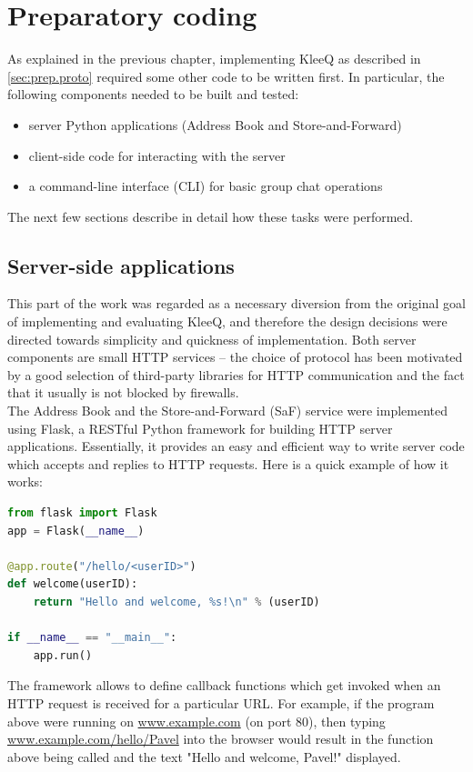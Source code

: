\documentclass[a4paper, 12pt]{report}
\begin{document}
\section{Preparatory coding}
\label{sec:impl.prep}
As explained in the previous chapter, implementing KleeQ as described in \cref{sec:prep.proto} required some other code to be written first. In particular, the following components needed to be built and tested:
\begin{itemize}
    \item server Python applications (Address Book and Store-and-Forward)
    \item client-side code for interacting with the server
    \item a command-line interface (CLI) for basic group chat operations
\end{itemize}
The next few sections describe in detail how these tasks were performed.

\subsection{Server-side applications}
\label{subsec:impl.prep.server}
This part of the work was regarded as a necessary diversion from the original goal of implementing and evaluating KleeQ, and therefore the design decisions were directed towards simplicity and quickness of implementation. Both server components are small HTTP services -- the choice of protocol has been motivated by a good selection of third-party libraries for HTTP communication and the fact that it usually is not blocked by firewalls.\\

The Address Book and the Store-and-Forward (SaF) service were implemented using Flask, a RESTful Python framework for building HTTP server applications. Essentially, it provides an easy and efficient way to write server code which accepts and replies to HTTP requests. Here is a quick example of how it works: \\

\begin{lstlisting}[language = Python, columns=fullflexible]
from flask import Flask
app = Flask(__name__)

@app.route("/hello/<userID>")
def welcome(userID):
    return "Hello and welcome, %s!\n" % (userID)
    
if __name__ == "__main__":
    app.run()
\end{lstlisting}


The framework allows to define callback functions which get invoked when an HTTP request is received for a particular URL. For example, if the program above were running on \url{www.example.com} (on port 80), then typing \url{www.example.com/hello/Pavel} into the browser would result in the function above being called and the text "Hello and welcome, Pavel!" displayed. \\
\end{document}
